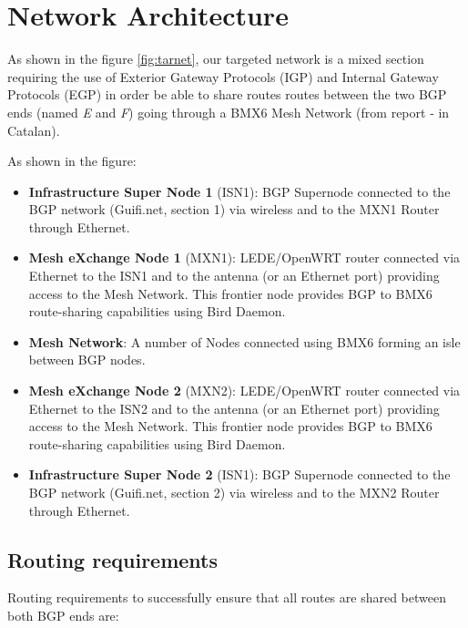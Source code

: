 \chapter{Network Architecture}
\label{ch:architecture}
\pagestyle{headings}

As shown in the figure \ref{fig:tarnet}, our targeted network is a mixed section requiring the use of Exterior Gateway Protocols (IGP) and Internal Gateway Protocols (EGP) in order be able to share routes routes between the two BGP ends (named \textit{E} and \textit{F}) going through a BMX6 Mesh Network (from report \cite{bgpbmx6} - in Catalan). 

As shown in the figure:
\begin{itemize}
    \item \textbf{Infrastructure Super Node 1} (ISN1): BGP Supernode connected to the BGP network (Guifi.net, section 1) via wireless and to the MXN1 Router through Ethernet.     
    \item \textbf{Mesh eXchange Node 1} (MXN1): LEDE/OpenWRT router connected via Ethernet to the ISN1 and to the antenna (or an Ethernet port) providing access to the Mesh Network. This frontier node provides BGP to BMX6 route-sharing capabilities using Bird Daemon.
    \item \textbf{Mesh Network}: A number of Nodes connected using BMX6 forming an isle between BGP nodes.
    \item \textbf{Mesh eXchange Node 2} (MXN2): LEDE/OpenWRT router connected via Ethernet to the ISN2 and to the antenna (or an Ethernet port) providing access to the Mesh Network. This frontier node provides BGP to BMX6 route-sharing capabilities using Bird Daemon.
    \item \textbf{Infrastructure Super Node 2} (ISN1): BGP Supernode connected to the BGP network (Guifi.net, section 2) via wireless and to the MXN2 Router through Ethernet.
\end{itemize}

\newpage

\section{Routing requirements}
Routing requirements to successfully ensure that all routes are shared between both BGP ends are:

